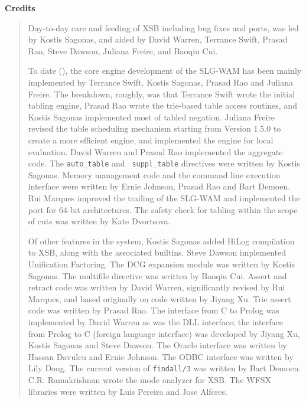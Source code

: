 \begin{center}
{\bf {\Large 
		Credits
}}
\end{center}


\begin{quote}
Day-to-day care and feeding of XSB including bug fixes and ports, was
led by Kostis Sagonas, and aided by David Warren, Terrance Swift,
Prasad Rao, Steve Dawson, Juliana Freire, and Baoqiu Cui.

To date (\version), the core engine development of the SLG-WAM has
been mainly implemented by Terrance Swift, Kostis Sagonas, Prasad Rao
and Juliana Freire.  The breakdown, roughly, was that Terrance Swift
wrote the initial tabling engine, Prasad Rao wrote the trie-based
table access routines, and Kostis Sagonas implemented most of tabled
negation.  Juliana Freire revised the table scheduling mechanism
starting from Version 1.5.0 to create a more efficient engine, and
implemented the engine for local evaluation.  David Warren and Prasad
Rao implemented the aggregate code.  The {\tt auto\_table} and {\tt
suppl\_table} directives were written by Kostis Sagonas.  Memory
management code and the command line execution interface were written
by Ernie Johnson, Prasad Rao and Bart Demoen.  Rui Marques improved
the trailing of the SLG-WAM and implemented the port for 64-bit
architectures.  The safety check for tabling within the scope of cuts
was written by Kate Dvortsova.

Of other features in the system, Kostis Sagonas added HiLog
compilation to XSB, along with the associated builtins.  Steve Dawson
implemented Unification Factoring.  The DCG expansion module was
written by Kostis Sagonas.  The multifile directive was written by
Baoqiu Cui.  Assert and retract code was written by David Warren,
significantly revised by Rui Marques, and based originally on code
written by Jiyang Xu.  Trie assert code was written by Prasad Rao.
The interface from C to Prolog was implemented by David Warren as was
the DLL interface; the interface from Prolog to C (foreign language
interface) was developed by Jiyang Xu, Kostis Sagonas and Steve
Dawson.  The Oracle interface was written by Hassan Davulcu and Ernie
Johnson.  The ODBC interface was written by Lily Dong.
The current version of {\tt findall/3} was written by Bart Demoen.
C.R. Ramakrishnan wrote the mode analyzer for XSB.  The WFSX libraries
were written by Luis Pereira and Jose Alferes.


\end{quote}
